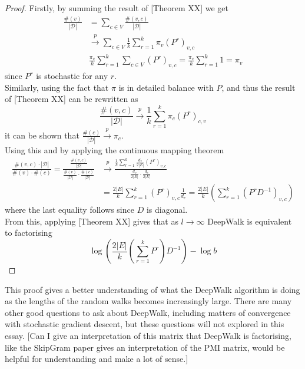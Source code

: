 \documentclass[a4paper]{article}
\newcommand{\D}{\mathcal D}
\begin{document}
\begin{proof}
  Firstly, by summing the result of [Theorem XX] we get
  \begin{align*}
    \frac{\#(v)}{|\D|} &= \sum_{c \in V}\frac{\#(v, c)}{|\D|}\\
                       &\overset{p}{\longrightarrow} \sum_{c \in V} \frac{1}{k}\sum_{r=1}^k \pi_v(P^r)_{v, c}\\
                       &\frac{\pi_v}{k}\sum_{r = 1}^k \sum_{c \in V}(P^r)_{v,c} = \frac{\pi_v}{k}\sum_{r = 1}^k 1 = \pi_v
  \end{align*}
  since $P^r$ is stochastic for any $r$.\\
  Similarly, using the fact that $\pi$ is in detailed balance with $P$, and thus
  the result of [Theorem XX] can be rewritten as
  \[\frac{\#(v, c)}{|\D|} \overset{p}{\longrightarrow} \frac{1}{k} \sum_{r = 1}^k \pi_c
    (P^r)_{c,v}\]
  it can be shown that $\frac{\#(c)}{|\D|} \overset{p}{\longrightarrow} \pi_c$.\\
  Using this and by applying the continuous mapping theorem
  \begin{align*}
    \frac{\#(v, c) \cdot |\D|}{\#(v) \cdot \#(c)} = \frac{\frac{\#(v,c)}{|\D|}}{\frac{\#(v)}{|\D|} \cdot \frac{\#(c)}{|\D|}} & \overset{p}{\longrightarrow} \frac{\frac{1}{k}\sum_{r=1}^{k} \frac{d_v}{2|E|}(P^r)_{v, c}}{\frac{d_v}{2|E|} \cdot \frac{d_c}{2|E|}}\\
                                                                                                                             &=\frac{2|E|}{k}\sum_{r=1}^k (P^r)_{v,c} \frac{1}{d_c} = \frac{2|E|}{k}\left( \sum_{r=1}^k(P^rD^{-1})_{v,c} \right)
  \end{align*}
  where the last equality follows since $D$ is diagonal.\\
  From this, applying [Theorem XX] gives that as $l \to \infty$ DeepWalk is equivalent to
  factorising
  \[\log \left( \frac{2|E|}{k}\left( \sum_{r=1}^k P^r \right)D^{-1}\right) - \log{b}\]
\end{proof}
\noindent This proof gives a better understanding of what the DeepWalk algorithm is doing as the lengths of the random walks becomes increasingly large.
There are many other good questions to ask about DeepWalk, including matters of convergence with stochastic gradient descent, but
these questions will not explored in this essay.
[Can I give an interpretation of this matrix that DeepWalk is factorising, like the SkipGram paper gives an interpretation of the PMI matrix, would be helpful for understanding and make a lot of sense.]
\end{document}
